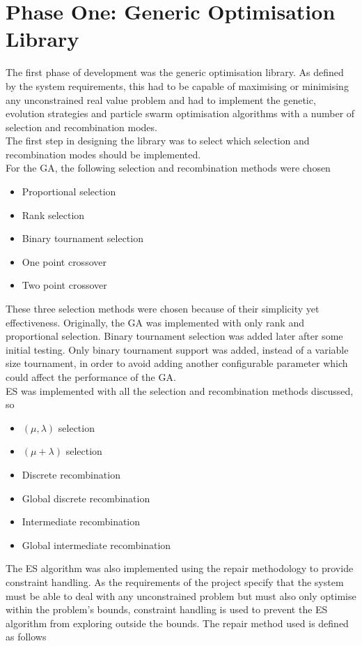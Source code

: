 \section{Phase One: Generic Optimisation Library}
The first phase of development was the generic optimisation library. As defined by the system requirements, this had to be capable of maximising or minimising any unconstrained real value problem and had to implement the genetic, evolution strategies and particle swarm optimisation algorithms with a number of selection and recombination modes.
\\The first step in designing the library was to select which selection and recombination modes should be implemented. 
\\For the GA, the following selection and recombination methods were chosen
\begin{itemize}
  \item{Proportional selection}
  \item{Rank selection}
  \item{Binary tournament selection}
  \item{One point crossover}
  \item{Two point crossover}
\end{itemize}
These three selection methods were chosen because of their simplicity yet effectiveness. Originally, the GA was implemented with only rank and proportional selection. Binary tournament selection was added later after some initial testing. Only binary tournament support was added, instead of a variable size tournament, in order to avoid adding another configurable parameter which could affect the performance of the GA.
\\ES was implemented with all the selection and recombination methods discussed, so
\begin{itemize}
  \item{$(\mu,\lambda)$ selection}
  \item{$(\mu+\lambda)$ selection}
  \item{Discrete recombination}
  \item{Global discrete recombination}
  \item{Intermediate recombination}
  \item{Global intermediate recombination}
\end{itemize}
The ES algorithm was also implemented using the repair methodology to provide constraint handling. As the requirements of the project specify that the system must be able to deal with any unconstrained problem but must also only optimise within the problem's bounds, constraint handling is used to prevent the ES algorithm from exploring outside the bounds. The repair method used is defined as follows
